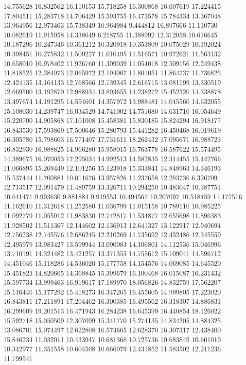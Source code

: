 14.755628
16.832562
16.110153
15.718258
16.300868
16.607619
17.224415
17.804511
15.283718
14.706429
15.593755
16.473578
15.784334
13.367048
13.964956
12.973463
15.738349
10.964984
9.444812
16.897666
11.110730
10.082619
11.915958
14.338649
6.218755
11.388992
12.312058
10.616645
10.187296
10.247346
10.361212
10.320918
10.353809
10.075029
10.192024
10.398451
10.275832
11.509227
11.010495
11.516571
10.972621
11.563132
10.658010
10.978402
11.926760
11.309039
11.054018
12.509156
12.249438
11.818525
12.284973
12.065972
12.194007
11.801051
11.864737
11.736825
12.424135
13.164133
12.768566
12.739345
12.616715
13.081799
13.330519
12.669500
13.192870
12.988934
13.893655
14.238272
15.452520
14.338878
13.497674
14.191295
14.594601
14.357972
13.988481
14.045560
14.632055
15.108030
14.239747
16.034529
14.741002
14.751680
14.631710
16.054649
15.220700
14.905868
17.101008
15.458381
15.830185
15.824294
16.918177
16.843530
17.593869
17.500646
15.280793
15.441282
16.450468
16.019619
16.305780
15.798603
16.771407
17.731611
18.262432
17.095671
16.988723
16.832930
16.988825
14.966280
15.958015
16.763778
16.587622
15.574495
14.389675
16.070053
17.295034
14.992513
14.582835
12.314455
15.442766
11.066895
15.269449
12.101256
15.123918
15.333841
14.848963
14.346193
15.537444
11.700881
10.011676
13.957826
11.237658
12.283736
6.326709
12.713517
12.091479
11.489759
13.326711
10.294250
10.483047
10.387751
10.641471
9.993630
9.881884
9.919553
10.494567
10.207097
10.518459
11.177516
11.162610
11.312618
11.252580
11.036799
11.015158
10.789110
10.985225
11.092779
11.055912
11.983830
12.742817
11.534877
12.655698
11.896383
11.928502
11.511367
12.144602
12.136913
12.641327
13.122917
12.940694
12.756238
12.745576
12.686245
12.210269
11.735692
12.432486
12.345559
12.495979
13.983427
13.599944
13.090083
14.106801
14.112536
15.046996
13.710191
14.324482
13.421257
13.371355
14.755612
15.109041
14.596712
14.451046
15.118286
14.536020
15.177758
14.154576
14.069085
14.645520
15.451823
14.820605
14.368845
15.399679
16.100468
16.015087
16.231432
15.597734
13.999463
16.919617
17.189970
18.056826
14.832759
17.562207
15.116446
15.177292
15.418273
16.347265
16.455605
14.999805
17.223020
16.843811
17.211891
17.204462
16.300385
16.495562
16.318307
14.886831
16.299609
19.201513
16.471943
16.284238
16.645399
16.440854
18.126022
15.592718
15.050509
12.307099
15.341770
15.274135
14.834205
14.884325
13.086701
15.074497
12.622808
16.574665
12.628370
16.307317
12.438400
15.846234
11.032011
10.433947
10.681368
10.725736
10.683849
10.601019
10.342977
11.351558
10.604508
10.666079
12.431852
11.583502
12.211236
11.799541
